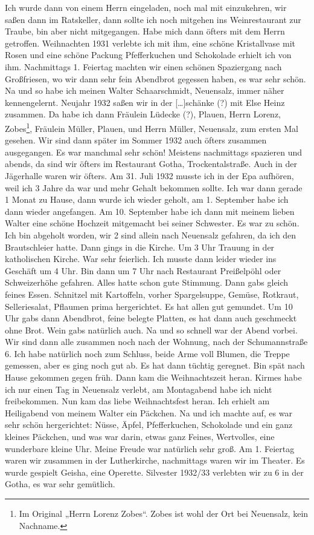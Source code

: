 \documentclass[a5paper,11pt,openany]{book}
\newcommand{\seite}[1]{\leavevmode\marginpar{\footnotesize\itshape\raggedright #1}\ignorespaces}
\begin{document}
\seite{14}
Ich wurde dann von einem Herrn eingeladen, noch mal mit einzukehren, wir saßen dann im Ratskeller,
  dann sollte ich noch mitgehen ins Weinrestaurant zur Traube, bin aber nicht mitgegangen.
Habe mich dann öfters mit dem Herrn getroffen.
Weihnachten 1931 verlebte ich mit ihm,
  eine schöne Kristallvase mit Rosen und eine schöne Packung Pfefferkuchen und Schokolade erhielt ich von ihm.
Nachmittags 1. Feiertag machten wir einen schönen Spaziergang nach Großfriesen, wo wir dann
\seite{15}
sehr fein Abendbrot gegessen haben, es war sehr schön.
Na und so habe ich meinen Walter Schaarschmidt, Neuensalz, immer näher kennengelernt.
Neujahr 1932 saßen wir in der [\ldots]schänke (?) mit Else Heinz zusammen.
Da habe ich dann Fräulein Lüdecke (?), Plauen, Herrn Lorenz, Zobes\footnote{Im Original „Herrn Lorenz Zobes“. Zobes ist wohl der Ort bei Neuensalz, kein Nachname.},
  Fräulein Müller, Plauen, und Herrn Müller, Neuensalz, zum ersten Mal gesehen.
Wir sind dann später im Sommer 1932 auch öfters zusammen ausgegangen.
Es war manchmal sehr schön!
Meistens nachmittags spazieren und abends, da sind wir öfters
\seite{16}
im Restaurant Gotha, Trockentalstraße.
Auch in der Jägerhalle waren wir öfters.
Am 31. Juli 1932 musste ich in der Epa aufhören, weil ich 3 Jahre da war und mehr Gehalt bekommen sollte.
Ich war dann gerade 1 Monat zu Hause, dann wurde ich wieder geholt, am 1. September habe ich dann wieder angefangen.
Am 10. September habe ich dann mit meinem lieben Walter eine schöne Hochzeit mitgemacht bei seiner Schwester.
Es war zu schön.
Ich bin abgeholt worden, wir 2 sind allein nach Neuensalz gefahren, da
\seite{17}
ich den Brautschleier hatte.
Dann gings in die Kirche.
Um 3 Uhr Trauung in der katholischen Kirche.
War sehr feierlich.
Ich musste dann leider wieder ins Geschäft um 4 Uhr.
Bin dann um 7 Uhr nach Restaurant Preißelpöhl oder Schweizerhöhe gefahren.
Alles hatte schon gute Stimmung.
Dann gabs gleich feines Essen.
Schnitzel mit Kartoffeln, vorher Spargelsuppe, Gemüse, Rotkraut, Selleriesalat, Pflaumen prima hergerichtet.
Es hat allen gut gemundet.
Um 10 Uhr gabs dann
\seite{18}
Abendbrot, feine belegte Platten, es hat dann auch geschmeckt ohne Brot.
Wein gabs natürlich auch.
Na und so schnell war der Abend vorbei.
Wir sind dann alle zusammen noch nach der Wohnung, nach der Schumannstraße 6.
Ich habe natürlich noch zum Schluss, beide Arme voll Blumen, die Treppe gemessen, aber es ging noch gut ab.
Es hat dann tüchtig geregnet.
Bin spät nach Hause gekommen gegen früh.
Dann kam die Weihnachtszeit heran.
Kirmes habe ich nur einen Tag in Neuensalz verlebt, am Montagabend
\seite{19}
habe ich nicht freibekommen.
Nun kam das liebe Weihnachtsfest heran.
Ich erhielt am Heiligabend von meinem Walter ein Päckchen.
Na und ich machte auf, es war sehr schön hergerichtet: Nüsse, Äpfel, Pfefferkuchen, Schokolade und ein ganz kleines Päckchen,
  und was war darin, etwas ganz Feines, Wertvolles, eine wunderbare kleine Uhr.
Meine Freude war natürlich sehr groß.
Am 1. Feiertag waren wir zusammen in der Lutherkirche, nachmittags waren wir im Theater.
Es wurde gespielt Geisha, eine Operette.
Silvester 1932/33 verlebten wir
\seite{20}
zu 6 in der Gotha, es war sehr gemütlich.
\end{document}

